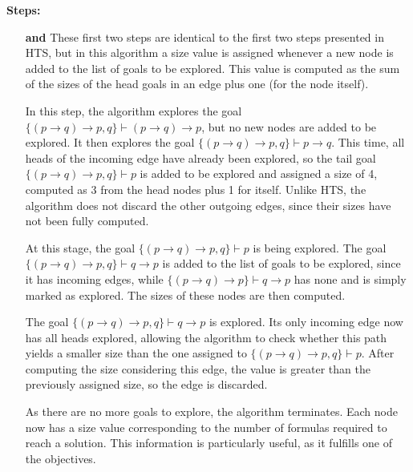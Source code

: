 \vspace{0.5em}
\textbf{Steps:}
\begin{enumerate}[align=left,labelwidth=*,labelsep=1em]
    \item[\textbf{\ordinalnum{1} and \ordinalnum{2}}] These first two steps are identical to the first two steps presented in \gls{HTS}, but in this algorithm a size value is assigned whenever a new node is added to the list of goals to be explored. This value is computed as the sum of the sizes of the head goals in an edge plus one (for the node itself).
    
    \item[\textbf{\ordinalnum{3}}] In this step, the algorithm explores the goal \(\{(p \to q) \to p, q\} \vdash (p \to q) \to p\), but no new nodes are added to be explored. It then explores the goal \(\{(p \to q) \to p, q\} \vdash p \to q\). This time, all heads of the incoming edge have already been explored, so the tail goal \(\{(p \to q) \to p, q\} \vdash p\) is added to be explored and assigned a size of 4, computed as 3 from the head nodes plus 1 for itself. Unlike \gls{HTS}, the algorithm does not discard the other outgoing edges, since their sizes have not been fully computed.
    
    \item[\textbf{\ordinalnum{4}}] At this stage, the goal \(\{(p \to q) \to p, q\} \vdash p\) is being explored. The goal \(\{(p \to q) \to p, q\} \vdash q \to p\) is added to the list of goals to be explored, since it has incoming edges, while \(\{(p \to q) \to p\} \vdash q \to p\) has none and is simply marked as explored. The sizes of these nodes are then computed.
    
    \item[\textbf{\ordinalnum{5}}] The goal \(\{(p \to q) \to p, q\} \vdash q \to p\) is explored. Its only incoming edge now has all heads explored, allowing the algorithm to check whether this path yields a smaller size than the one assigned to \(\{(p \to q) \to p, q\} \vdash p\). After computing the size considering this edge, the value is greater than the previously assigned size, so the edge is discarded.
    
    \item[\textbf{\ordinalnum{6}}] As there are no more goals to explore, the algorithm terminates. Each node now has a size value corresponding to the number of formulas required to reach a solution. This information is particularly useful, as it fulfills one of the objectives.
\end{enumerate}


